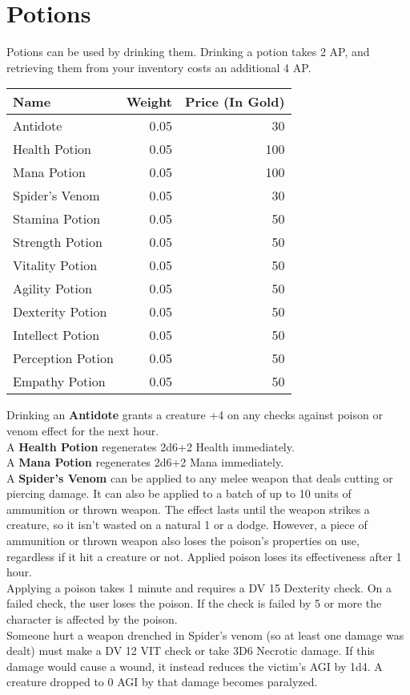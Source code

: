 \section{Potions}
Potions can be used by drinking them. Drinking a potion takes 2 AP, and retrieving them from your inventory costs an additional 4 AP.

\begin{longtable}{l | r | r}
	Name & Weight & Price (In Gold)\\ \hline
	Antidote & 0.05 & 30\\
	Health Potion & 0.05 & 100\\
	Mana Potion & 0.05 & 100\\
	Spider's Venom & 0.05 & 30\\
	Stamina Potion & 0.05 & 50\\
	Strength Potion & 0.05 & 50\\
	Vitality Potion & 0.05 & 50\\
	Agility Potion & 0.05 & 50\\
	Dexterity Potion & 0.05 & 50\\
	Intellect Potion & 0.05 & 50\\
	Perception Potion & 0.05 & 50\\
	Empathy Potion & 0.05 & 50\\
\end{longtable}


Drinking an \textbf{Antidote} grants a creature +4 on any checks against poison or venom effect for the next hour.\\

A \textbf{Health Potion} regenerates 2d6+2 Health immediately.\\

A \textbf{Mana Potion} regenerates 2d6+2 Mana immediately.\\

A \textbf{Spider's Venom} can be applied to any melee weapon that deals cutting or piercing damage. It can also be applied to a batch of up to 10 units of ammunition or thrown weapon. The effect lasts until the weapon strikes a creature, so it isn't wasted on a natural 1 or a dodge. However, a piece of ammunition or thrown weapon also loses the poison's properties on use, regardless if it hit a creature or not. Applied poison loses its effectiveness after 1 hour.\\
Applying a poison takes 1 minute and requires a DV 15 Dexterity check. On a failed check, the user loses the poison. If the check is failed by 5 or more the character is affected by the poison.\\
Someone hurt a weapon drenched in Spider's venom (so at least one damage was dealt) must make a DV 12 VIT check or take 3D6 Necrotic damage. If this damage would cause a wound, it instead reduces the victim's AGI by 1d4. A creature dropped to 0 AGI by that damage becomes paralyzed.\\

